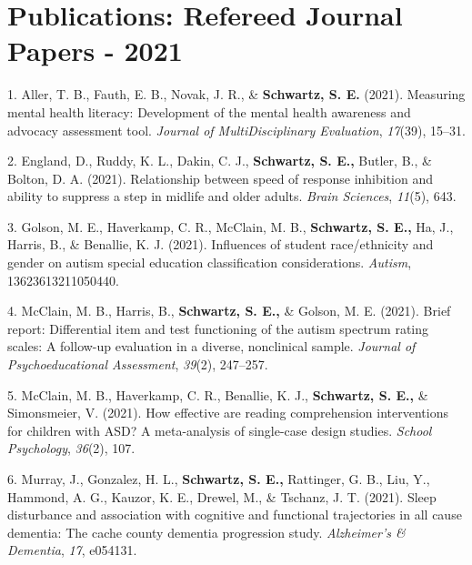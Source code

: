 \documentclass[11pt,a4paper,]{moderncv}
\newlength{\cslhangindent}
\newenvironment{CSLReferences}[2] %
 {\begin{list}{}{%
  \setlength{\itemindent}{0pt}
  \setlength{\leftmargin}{0pt}
  \setlength{\parsep}{0pt}
  \ifodd #1
   \setlength{\leftmargin}{\cslhangindent}
   \setlength{\itemindent}{-1\cslhangindent}
  \fi
  \setlength{\itemsep}{#2\baselineskip}}}
 {\end{list}}
\begin{document}
\endgroup

\vspace{7mm}

\section{Publications: Refereed Journal Papers -
2021}\label{publications-refereed-journal-papers---2021}

\begingroup
\setlength{\parindent}{-0.5in}
\setlength{\leftskip}{0.5in}

\label{refs-fff70958d5cbcb8481e89a9702523ebd}
\begin{CSLReferences}{1}{0}
1. Aller, T. B., Fauth, E. B., Novak, J. R., \& \textbf{Schwartz, S. E.}
(2021). Measuring mental health literacy: Development of the mental
health awareness and advocacy assessment tool. \emph{Journal of
MultiDisciplinary Evaluation}, \emph{17}(39), 15--31.

2. England, D., Ruddy, K. L., Dakin, C. J., \textbf{Schwartz, S. E.,}
Butler, B., \& Bolton, D. A. (2021). Relationship between speed of
response inhibition and ability to suppress a step in midlife and older
adults. \emph{Brain Sciences}, \emph{11}(5), 643.

3. Golson, M. E., Haverkamp, C. R., McClain, M. B.,
\textbf{Schwartz, S. E.,} Ha, J., Harris, B., \& Benallie, K. J. (2021).
Influences of student race/ethnicity and gender on autism special
education classification considerations. \emph{Autism},
13623613211050440.

4. McClain, M. B., Harris, B., \textbf{Schwartz, S. E.,} \& Golson, M.
E. (2021). Brief report: Differential item and test functioning of the
autism spectrum rating scales: A follow-up evaluation in a diverse,
nonclinical sample. \emph{Journal of Psychoeducational Assessment},
\emph{39}(2), 247--257.

5. McClain, M. B., Haverkamp, C. R., Benallie, K. J.,
\textbf{Schwartz, S. E.,} \& Simonsmeier, V. (2021). How effective are
reading comprehension interventions for children with ASD? A
meta-analysis of single-case design studies. \emph{School Psychology},
\emph{36}(2), 107.

6. Murray, J., Gonzalez, H. L., \textbf{Schwartz, S. E.,} Rattinger, G.
B., Liu, Y., Hammond, A. G., Kauzor, K. E., Drewel, M., \& Tschanz, J.
T. (2021). Sleep disturbance and association with cognitive and
functional trajectories in all cause dementia: The cache county dementia
progression study. \emph{Alzheimer's \& Dementia}, \emph{17}, e054131.


\end{CSLReferences}
\end{document}
